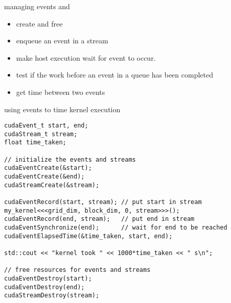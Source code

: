 \begin{frame}[fragile]{}
    \begin{info}{managing events}
         and 
            \begin{itemize}
                \item create and free 
            \end{itemize}
            \begin{itemize}
                \item enqueue an event in a stream
            \end{itemize}
            \begin{itemize}
                \item make host execution wait for event to occur.
            \end{itemize}
            \begin{itemize}
                \item test if the work before an event in a queue has been completed
            \end{itemize}
            \begin{itemize}
                \item get time between two events
            \end{itemize}
    \end{info}
\end{frame}

\begin{frame}[fragile]{}
    \begin{code}{using events to time kernel execution}
        \begin{lstlisting}[style=boxcudatiny]
cudaEvent_t start, end;
cudaStream_t stream;
float time_taken;

// initialize the events and streams
cudaEventCreate(&start);
cudaEventCreate(&end);
cudaStreamCreate(&stream);

cudaEventRecord(start, stream); // put start in stream
my_kernel<<<grid_dim, block_dim, 0, stream>>>();
cudaEventRecord(end, stream);   // put end in stream
cudaEventSynchronize(end);      // wait for end to be reached
cudaEventElapsedTime(&time_taken, start, end);

std::cout << "kernel took " << 1000*time_taken << " s\n";

// free resources for events and streams
cudaEventDestroy(start);
cudaEventDestroy(end);
cudaStreamDestroy(stream);
        \end{lstlisting}
    \end{code}
\end{frame}

